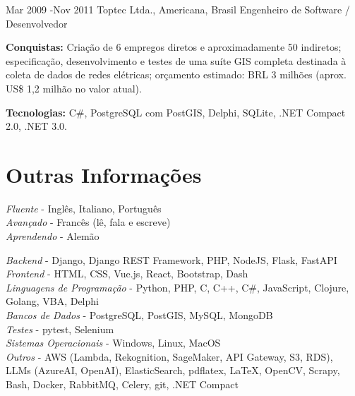 \documentclass[10pt]{article} %
\begin{document}
\job
{Mar 2009 -}{Nov 2011}
{Toptec Ltda., Americana, Brasil}
{}
{Engenheiro de Software / Desenvolvedor}
{\rule{0mm}{2mm}\textbf{Conquistas:} Criação de 6 empregos diretos e aproximadamente 50 indiretos; especificação, desenvolvimento e testes de uma suíte GIS completa destinada à coleta de dados de redes elétricas; orçamento estimado: BRL 3 milhões (aprox. US\$ 1,2 milhão no valor atual).\\
\rule{0mm}{3mm}\textbf{Tecnologias:} C\#, PostgreSQL com PostGIS, Delphi, SQLite, .NET Compact 2.0, .NET 3.0.}



\section{Outras Informações}

{
\textit{Fluente} - Inglês, Italiano, Português\\
\textit{Avançado} - Francês (lê, fala e escreve)\\
\textit{Aprendendo} - Alemão\\
}


{
\textit{Backend} - Django, Django REST Framework, PHP, NodeJS, Flask, FastAPI\\
\textit{Frontend} - HTML, CSS, Vue.js, React, Bootstrap, Dash\\
\textit{Linguagens de Programação} - Python, PHP, C, C++, C\#, JavaScript, Clojure, Golang, VBA, Delphi\\
\textit{Bancos de Dados} - PostgreSQL, PostGIS, MySQL, MongoDB\\
\textit{Testes} - pytest, Selenium\\
\textit{Sistemas Operacionais} - Windows, Linux, MacOS\\
\textit{Outros} - AWS (Lambda, Rekognition, SageMaker, API Gateway, S3, RDS), LLMs (AzureAI, OpenAI), ElasticSearch, pdflatex, LaTeX, OpenCV, Scrapy, Bash, Docker, RabbitMQ, Celery, git, .NET Compact\\
}
\end{document}
